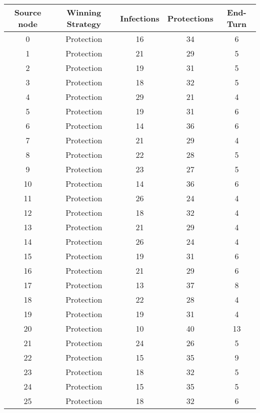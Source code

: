 \documentclass[results.tex]{subfiles}
\begin{document}
\begin{center}
  \begin{tabular}{| c || c | c | c | c |}
    \hline
    {\bfseries Source node} & {\bfseries Winning Strategy} & {\bfseries Infections} & {\bfseries Protections} & {\bfseries End-Turn} \\  %
    \hline\hline
    0 & Protection & 16 & 34 & 6 \\ 
    \hline
    1 & Protection & 21 & 29 & 5 \\ 
    \hline
    2 & Protection & 19 & 31 & 5 \\ 
    \hline
    3 & Protection & 18 & 32 & 5 \\ 
    \hline
    4 & Protection & 29 & 21 & 4 \\ 
    \hline
    5 & Protection & 19 & 31 & 6 \\ 
    \hline
    6 & Protection & 14 & 36 & 6 \\ 
    \hline
    7 & Protection & 21 & 29 & 4 \\ 
    \hline
    8 & Protection & 22 & 28 & 5 \\ 
    \hline
    9 & Protection & 23 & 27 & 5 \\ 
    \hline
    10 & Protection & 14 & 36 & 6 \\ 
    \hline
    11 & Protection & 26 & 24 & 4 \\ 
    \hline
    12 & Protection & 18 & 32 & 4 \\ 
    \hline
    13 & Protection & 21 & 29 & 4 \\ 
    \hline
    14 & Protection & 26 & 24 & 4 \\ 
    \hline
    15 & Protection & 19 & 31 & 6 \\ 
    \hline
    16 & Protection & 21 & 29 & 6 \\ 
    \hline
    17 & Protection & 13 & 37 & 8 \\ 
    \hline
    18 & Protection & 22 & 28 & 4 \\ 
    \hline
    19 & Protection & 19 & 31 & 4 \\ 
    \hline
    20 & Protection & 10 & 40 & 13 \\ 
    \hline
    21 & Protection & 24 & 26 & 5 \\ 
    \hline
    22 & Protection & 15 & 35 & 9 \\ 
    \hline
    23 & Protection & 18 & 32 & 5 \\ 
    \hline
    24 & Protection & 15 & 35 & 5 \\ 
    \hline
    25 & Protection & 18 & 32 & 6 \\ 

\end{tabular}
\end{center}
\end{document}
